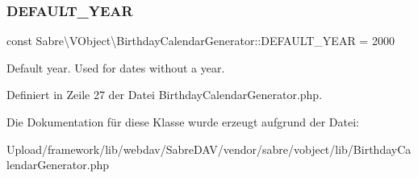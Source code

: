 \subsubsection{\texorpdfstring{D\+E\+F\+A\+U\+L\+T\+\_\+\+Y\+E\+AR}{DEFAULT\_YEAR}}
{\footnotesize\ttfamily const Sabre\textbackslash{}\+V\+Object\textbackslash{}\+Birthday\+Calendar\+Generator\+::\+D\+E\+F\+A\+U\+L\+T\+\_\+\+Y\+E\+AR = 2000}

Default year. Used for dates without a year. 

Definiert in Zeile 27 der Datei Birthday\+Calendar\+Generator.\+php.



Die Dokumentation für diese Klasse wurde erzeugt aufgrund der Datei\+:\begin{DoxyCompactItemize}
\item 
Upload/framework/lib/webdav/\+Sabre\+D\+A\+V/vendor/sabre/vobject/lib/Birthday\+Calendar\+Generator.\+php\end{DoxyCompactItemize}
